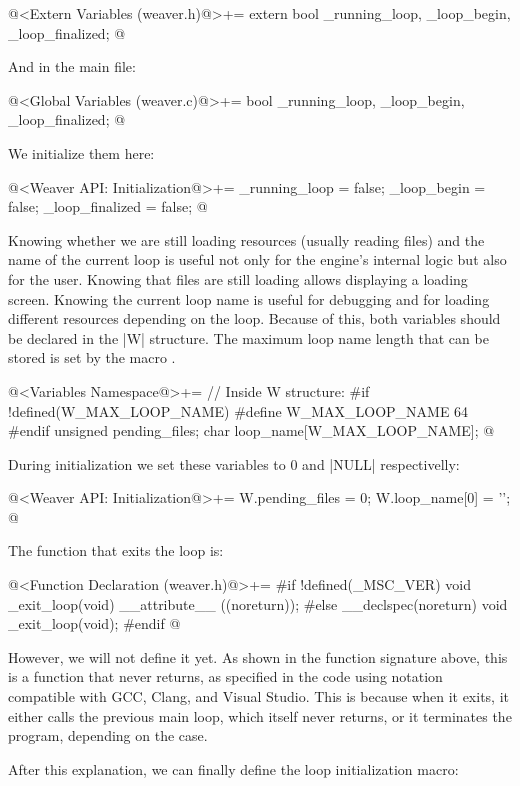 \iniciocodigo
@<Extern Variables (weaver.h)@>+=
extern bool _running_loop, _loop_begin, _loop_finalized;
@
\fimcodigo

And in the main file:

\iniciocodigo
@<Global Variables (weaver.c)@>+=
bool _running_loop, _loop_begin, _loop_finalized;
@
\fimcodigo

We initialize them here:

\iniciocodigo
@<Weaver API: Initialization@>+=
_running_loop = false;
_loop_begin = false;
_loop_finalized = false;
@
\fimcodigo

Knowing whether we are still loading resources (usually reading files)
and the name of the current loop is useful not only for the engine’s
internal logic but also for the user. Knowing that files are still
loading allows displaying a loading screen. Knowing the current loop
name is useful for debugging and for loading different resources
depending on the loop. Because of this, both variables should be
declared in the |W| structure. The maximum loop name length that can
be stored is set by the macro .

\iniciocodigo
@<Variables Namespace@>+=
// Inside W structure:
#if !defined(W_MAX_LOOP_NAME)
#define W_MAX_LOOP_NAME 64
#endif
unsigned pending_files;
char loop_name[W_MAX_LOOP_NAME];
@
\fimcodigo

During initialization we set these variables to 0 and |NULL|
respectivelly:

\iniciocodigo
@<Weaver API: Initialization@>+=
W.pending_files = 0;
W.loop_name[0] = '\0';
@
\fimcodigo

The function that exits the loop is:

\iniciocodigo
@<Function Declaration (weaver.h)@>+=
#if !defined(_MSC_VER)
void _exit_loop(void) __attribute__ ((noreturn));
#else
__declspec(noreturn) void _exit_loop(void);
#endif
@
\fimcodigo

However, we will not define it yet. As shown in the function signature
above, this is a function that never returns, as specified in the code
using notation compatible with GCC, Clang, and Visual Studio. This is
because when it exits, it either calls the previous main loop, which
itself never returns, or it terminates the program, depending on the
case.

After this explanation, we can finally define the loop initialization
macro:

